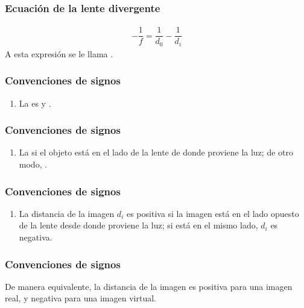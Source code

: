 \documentclass[14pt]{beamer}
\begin{document}
\begin{frame}
\frametitle{Ecuación de la lente divergente}
\begin{align*}
- \dfrac{1}{f} = \dfrac{1}{d_{0}} - \dfrac{1}{d_{i}}
\end{align*}
A esta expresión se le llama .
\end{frame}
\begin{frame}
\frametitle{Convenciones de signos}
\begin{enumerate}[<+->]
\item La  es  \pause y .
\seti
\end{enumerate}
\end{frame}
\begin{frame}
\frametitle{Convenciones de signos}
\begin{enumerate}[<+->]
\conti
\item La  si el objeto está en el lado de la lente de donde proviene la luz; \pause de otro modo, .
\seti
\end{enumerate}
\end{frame}
\begin{frame}
\frametitle{Convenciones de signos}
\begin{enumerate}[<+->]
\conti
\item La distancia de la imagen $d_{i}$ es positiva si la imagen está en el lado opuesto de la lente desde donde proviene la luz; si está en el mismo lado, $d_{i}$ es negativa.
\seti
\end{enumerate}
\end{frame}
\begin{frame}
\frametitle{Convenciones de signos}
De manera equivalente, la distancia de la imagen es positiva para una imagen real, y negativa para una imagen virtual.
\end{frame}
\end{document}
